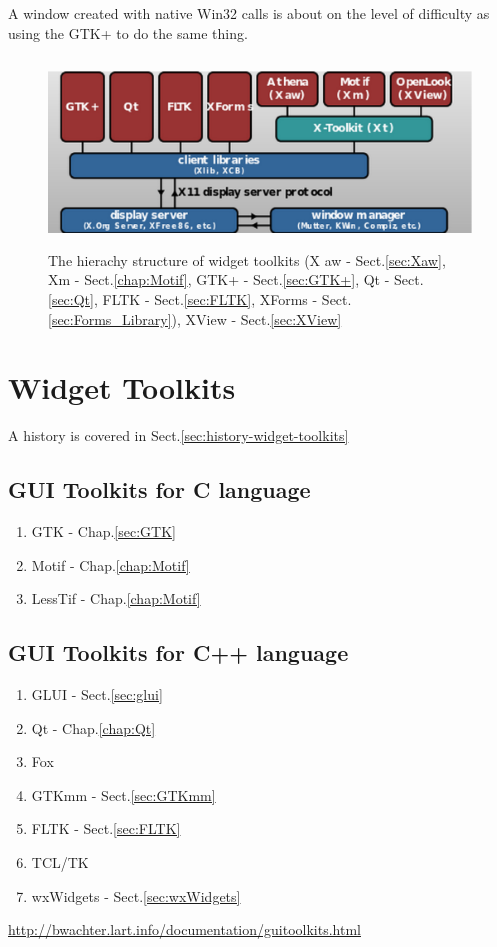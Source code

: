 A window created with native Win32 calls is about on the level of difficulty as
using the GTK+ to do the same thing. 

\begin{figure}[hbt]
  \centerline{\includegraphics[height=5cm,
    angle=0]{./images/widget_library_system.eps}}
\caption{The hierachy structure of widget toolkits (X aw - Sect.\ref{sec:Xaw}, 
Xm - Sect.\ref{chap:Motif}, GTK+ - Sect.\ref{sec:GTK+},
Qt - Sect.\ref{sec:Qt}, FLTK - Sect.\ref{sec:FLTK}, XForms - Sect.\ref{sec:Forms_Library}),
XView - Sect.\ref{sec:XView}}
\label{fig:widget_library_system}
\end{figure}

\section{Widget Toolkits}
\label{sec:widget-toolkits-list}

A history is covered in Sect.\ref{sec:history-widget-toolkits}

\subsection{GUI Toolkits for C language}

\begin{enumerate}
  \item GTK - Chap.\ref{sec:GTK}
  \item Motif - Chap.\ref{chap:Motif}
  \item LessTif - Chap.\ref{chap:Motif}
\end{enumerate}

\subsection{GUI Toolkits for C++ language}

\begin{enumerate}
  \item GLUI - Sect.\ref{sec:glui}
  \item Qt - Chap.\ref{chap:Qt}
  \item Fox
  \item GTKmm - Sect.\ref{sec:GTKmm}
  \item FLTK - Sect.\ref{sec:FLTK}
  \item TCL/TK
  \item wxWidgets - Sect.\ref{sec:wxWidgets}
\end{enumerate}
\url{http://bwachter.lart.info/documentation/guitoolkits.html}


